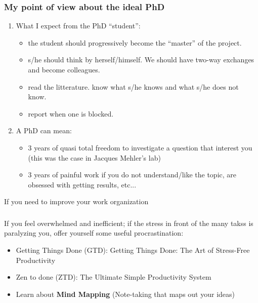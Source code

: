 \documentclass{beamer}
\newcounter{saveenumi}
\newcommand{\conti}{\setcounter{enumi}{\value{saveenumi}}}
\begin{document}
\begin{frame}
\frametitle{My point of view about the ideal  PhD}

\begin{enumerate}
\conti
\item  What I expect from the PhD ``student'':

  {\small
  \begin{itemize}
  \item the student should progressively become the ``master'' of the project.
  \item s/he should think by herself/himself. We should have two-way
    exchanges and become colleagues.
  \item read the litterature. know what s/he knows and what s/he does
    not know.
  \item report  when one is blocked.
  \end{itemize}
  }

\pause

\item A PhD can mean:  

  {\small 
  \begin{itemize}
  \item 3 years of quasi total freedom to investigate a question that
    interest you (this was the case in Jacques Mehler's lab) 
  \item 3 years of painful work if you do not understand/like the
    topic, are obsessed with getting results, etc...
  \end{itemize}
  }

\end{enumerate}
 
\end{frame}

\begin{frame}{If you need to improve your work organization}
\frametitle{}

If you feel overwhelmed and inefficient; if the stress in front of the
many takss is paralyzing you, offer yourself some useful
procrastination:

\begin{itemize}

\item Getting Things Done (GTD): Getting Things Done: The Art of
    Stress-Free Productivity

\item Zen to done (ZTD): The Ultimate Simple Productivity
    System

\item Learn about \textbf{Mind Mapping} (Note-taking that maps out your ideas)
\end{itemize}

\end{frame}
\end{document}

